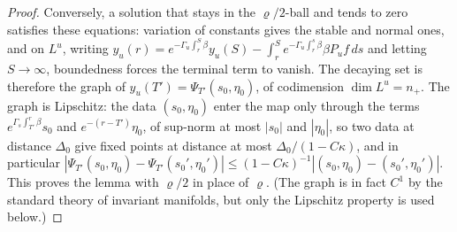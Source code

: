 \documentclass{article} %
\theoremstyle{plain}
\theoremstyle{definition}
\theoremstyle{remark}
\begin{document}
\begin{proof}
Conversely, a solution that stays in the $\varrho/2$-ball and tends to zero satisfies these
equations: variation of constants gives the stable and normal ones, and on $L^u$, writing
$y_u(r)=e^{-\Gamma_u\int_r^{S}\beta}y_u(S)-\int_r^Se^{-\Gamma_u\int_r^s\beta}\beta P_uf\,ds$ and
letting $S\to\infty$, boundedness forces the terminal term to vanish. The decaying set is
therefore the graph of $y_u(T')=\Psi_{T'}(s_0,\eta_0)$, of codimension $\dim L^u=n_+$. The
graph is Lipschitz: the data $(s_0,\eta_0)$ enter the map only through the terms
$e^{\Gamma_s\int_{T'}^r\beta}s_0$ and $e^{-(r-T')}\eta_0$, of sup-norm at most $|s_0|$ and
$|\eta_0|$, so two data at distance $\Delta_0$ give fixed points at distance at most
$\Delta_0/(1-C\kappa)$, and in particular $|\Psi_{T'}(s_0,\eta_0)-\Psi_{T'}(s_0',\eta_0')|\le
(1-C\kappa)^{-1}|(s_0,\eta_0)-(s_0',\eta_0')|$. This proves the lemma with $\varrho/2$ in place
of $\varrho$. (The graph is in fact $C^1$ by the standard theory of invariant manifolds, but
only the Lipschitz property is used below.)
\end{proof}
\end{document}
